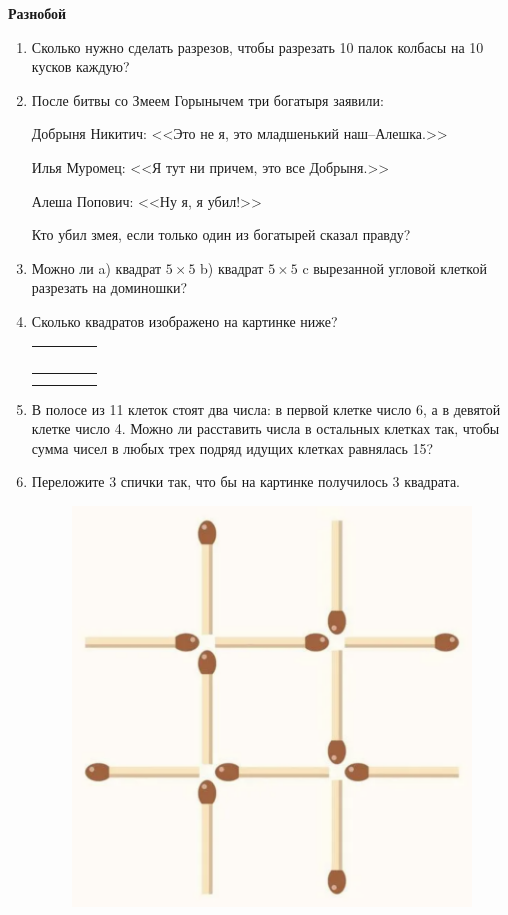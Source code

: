 \documentclass{article}
\begin{document}
\large
	
\begin{center}
	\textbf{Разнобой}
\end{center}


\begin{enumerate}[label*=\protect\fbox{\arabic{enumi}}]
	
\item Сколько нужно сделать разрезов, чтобы разрезать 10 палок колбасы на 10 кусков каждую?

\item После битвы со Змеем Горынычем три богатыря заявили: 

Добрыня Никитич: <<Это не я, это младшенький наш–Алешка.>> 

Илья Муромец: <<Я тут ни причем, это все Добрыня.>>

Алеша Попович: <<Ну я, я убил!>>

Кто убил змея, если только один из богатырей сказал правду?

\item Можно ли a) квадрат $5 \times 5$ b) квадрат $5 \times 5$ c вырезанной угловой клеткой разрезать на доминошки? 

\item Сколько квадратов изображено на картинке ниже?

\begin{table}[h]
	\centering
	\begin{tabular}{|c|c|c|c|} \hline
		\, & \, & \,& \, \\\hline
		 &  &  & \\\hline
		 &  &  & \\\hline
	 \end{tabular}
\end{table}

\item В полосе из 11 клеток стоят два числа: в первой клетке число 6, а в девятой клетке число 4. Можно ли расставить числа в остальных клетках так, чтобы сумма чисел в любых трех подряд идущих клетках равнялась 15?

\item Переложите 3 спички так, что бы на картинке получилось 3 квадрата.

\begin{figure}[h]
	\centering
	\includegraphics[width=0.3\linewidth]{spichki.png}
\end{figure}


\end{enumerate}
\end{document}
